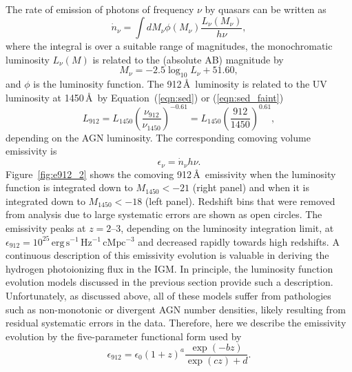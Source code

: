\documentclass[fleqn,usenatbib]{mnras}
\begin{document}
      The rate of emission of photons of frequency $\nu$ by quasars can be
      written as
      \begin{equation}
        \dot n_\nu = \int dM_\nu \phi(M_\nu) \frac{L_\nu(M_\nu)}{h\nu},
      \end{equation}
      where the integral is over a suitable range of magnitudes, the
      monochromatic luminosity $L_\nu(M)$ is related to the (absolute AB)
      magnitude by \citep{1983ApJ...266..713O}
      \begin{equation}
        M_\nu = -2.5\log_{10}L_\nu+51.60,
      \end{equation}
      and $\phi$ is the luminosity function.  The 912\,\AA\ luminosity is
      related to the UV luminosity at 1450\,\AA\ by Equation~(\ref{eqn:sed})
      or (\ref{eqn:sed_faint})
      \begin{equation}
        L_{912}=L_{1450}\left(\frac{\nu_{912}}{\nu_{1450}}\right)^{-0.61}=L_{1450}\left(\frac{912}{1450}\right)^{0.61},
      \end{equation}
      depending on the AGN luminosity.  The corresponding comoving volume
      emissivity is
      \begin{equation}
        \epsilon_\nu = \dot n_\nu h\nu.
        \label{eqn:epsilon}
      \end{equation}
      Figure~\ref{fig:e912_2} shows the comoving 912\,\AA\ emissivity when
      the luminosity function is integrated down to $M_{1450}<-21$ (right
      panel) and when it is integrated down to $M_{1450}<-18$ (left panel).
      Redshift bins that were removed from analysis due to large systematic
      errors are shown as open circles.  The emissivity peaks at $z=2$--$3$,
      depending on the luminosity integration limit, at
      $\epsilon_{912}=10^{25}\,\mathrm{erg\, s^{-1}\, Hz^{-1}\, cMpc^{-3}}$
      and decreased rapidly towards high redshifts.  A continuous
      description of this emissivity evolution is valuable in deriving the
      hydrogen photoionizing flux in the IGM.  In principle, the luminosity
      function evolution models discussed in the previous section provide
      such a description.  Unfortunately, as discussed above, all of these
      models suffer from pathologies such as non-monotonic or divergent AGN
      number densities, likely resulting from residual systematic errors in
      the data.  Therefore, here we describe the emissivity evolution by the
      five-parameter functional form used by \citet{2012ApJ...746..125H}
      \begin{equation}
        \epsilon_{912}=\epsilon_0(1+z)^a\frac{\exp(-bz)}{\exp(cz)+d}.
        \label{eqn:e912fit}
      \end{equation}
\end{document}
